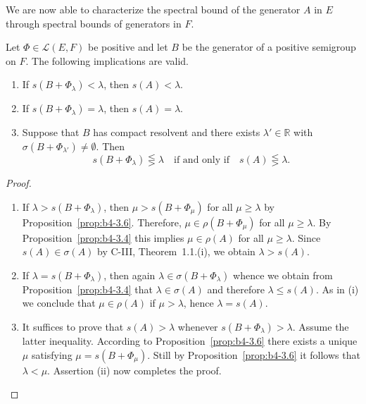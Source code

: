 We are now able to characterize the spectral bound of the generator $A$ in $E$ through spectral bounds of generators in $F$.
\begin{theorem}\label{thm:b4-3.7}
	Let $\Phi \in \mathcal{L}(E,F)$ be positive and let $B$ be the generator of a positive semigroup on $F$. 
	The following implications are valid.
	\begin{enumerate}[\upshape (i)]
		\item If $s(B + \Phi_{\lambda}) < \lambda$, then $s(A) < \lambda$.
        
		\item If $s(B + \Phi_{\lambda}) = \lambda$, then $s(A) = \lambda$.
        
		\item Suppose that $B$ has compact resolvent and there exists $\lambda' \in \mathbb{R}$ with $\sigma(B + \Phi_{\lambda'}) \neq \emptyset$. 
		Then
		\begin{equation}\label{eq:b4-3.6}
		s(B + \Phi_{\lambda}) \lesseqgtr \lambda \quad \text{if and only if} \quad s(A) \lesseqgtr \lambda.
		\end{equation}
	\end{enumerate}
\end{theorem}
\begin{proof}
	\begin{enumerate}[\upshape (i), wide, labelsep=1em, itemsep=1ex]
	\item 
	If $\lambda > s(B + \Phi_{\lambda})$, then $\mu > s(B + \Phi_{\mu})$ for all $\mu \geq \lambda$ by Proposition~\ref{prop:b4-3.6}.  
	Therefore, $\mu \in \rho(B + \Phi_{\mu})$ for all $\mu \geq \lambda$. 
	By Proposition~\ref{prop:b4-3.4} this implies $\mu \in \rho(A)$ for all $\mu \geq \lambda$. 
	Since $s(A) \in \sigma(A)$ by C-III, Theorem~1.1.(i), we obtain $\lambda > s(A)$.
	
    \item 
	If $\lambda = s(B + \Phi_{\lambda})$, then again $\lambda \in \sigma(B + \Phi_{\lambda})$ whence we obtain from Proposition~\ref{prop:b4-3.4} that $\lambda \in \sigma(A)$ and therefore $\lambda \leq s(A)$. 
	As in (i) we conclude that $\mu \in \rho(A)$ if $\mu > \lambda$, hence $\lambda = s(A)$.
	
	\item 
	It suffices to prove that $s(A) > \lambda$ whenever $s(B + \Phi_{\lambda}) > \lambda$. 
	Assume the latter inequality. 
	According to Proposition~\ref{prop:b4-3.6} there exists a unique $\mu$ satisfying $\mu = s(B + \Phi_{\mu})$. 
	Still by Proposition~\ref{prop:b4-3.6} it follows that $\lambda < \mu$. 
	Assertion (ii) now completes the proof.
	\end{enumerate}
\end{proof}
